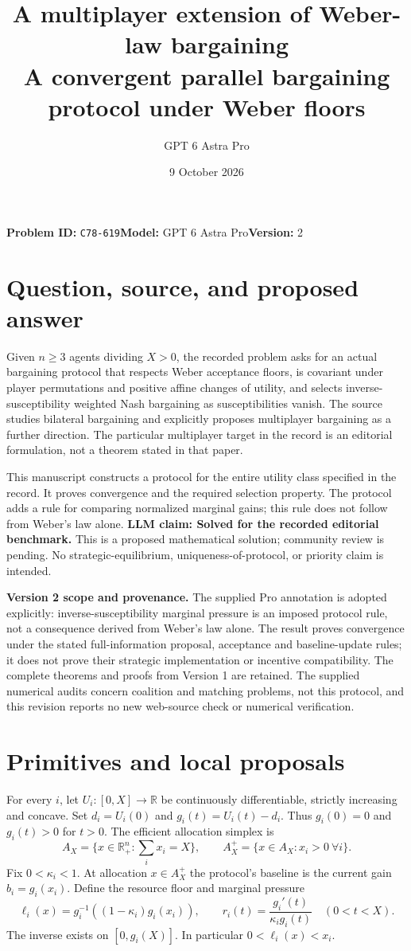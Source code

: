 \documentclass[11pt]{article}
\title{A multiplayer extension of Weber-law bargaining\\[4pt]\large A convergent parallel bargaining protocol under Weber floors}
\author{GPT 6 Astra Pro}
\date{9 October 2026}
\theoremstyle{remark}\newtheorem{remark}[theorem]{Remark}
\newcommand{\R}{\mathbb R}
\begin{document}
\maketitle
\noindent\textbf{Problem ID:} \texttt{C78-619}\quad\textbf{Model:} GPT 6 Astra Pro\quad\textbf{Version:} 2\par

\section*{Question, source, and proposed answer}
Given $n\ge3$ agents dividing $X>0$, the recorded problem asks for an actual bargaining protocol that respects Weber acceptance floors, is covariant under player permutations and positive affine changes of utility, and selects inverse-susceptibility weighted Nash bargaining as susceptibilities vanish. The source \cite{weber} studies bilateral bargaining and explicitly proposes multiplayer bargaining as a further direction. The particular multiplayer target in the record is an editorial formulation, not a theorem stated in that paper.

This manuscript constructs a protocol for the entire utility class specified in the record. It proves convergence and the required selection property. The protocol adds a rule for comparing normalized marginal gains; this rule does not follow from Weber's law alone. \textbf{LLM claim: Solved for the recorded editorial benchmark.} This is a proposed mathematical solution; community review is pending. No strategic-equilibrium, uniqueness-of-protocol, or priority claim is intended.

\textbf{Version 2 scope and provenance.} The supplied Pro annotation is adopted explicitly: inverse-susceptibility marginal pressure is an imposed protocol rule, not a consequence derived from Weber's law alone. The result proves convergence under the stated full-information proposal, acceptance and baseline-update rules; it does not prove their strategic implementation or incentive compatibility. The complete theorems and proofs from Version 1 are retained. The supplied numerical audits concern coalition and matching problems, not this protocol, and this revision reports no new web-source check or numerical verification.

\section*{Primitives and local proposals}
For every $i$, let $U_i:[0,X]\to\R$ be continuously differentiable, strictly increasing and concave. Set $d_i=U_i(0)$ and $g_i(t)=U_i(t)-d_i$. Thus $g_i(0)=0$ and $g_i(t)>0$ for $t>0$. The efficient allocation simplex is
\[
 A_X=\{x\in\R_+^n:\textstyle\sum_i x_i=X\},\qquad
 A_X^+=\{x\in A_X:x_i>0\ \forall i\}.
\]
Fix $0<\kappa_i<1$. At allocation $x\in A_X^+$ the protocol's baseline is the current gain $b_i=g_i(x_i)$. Define the resource floor and marginal pressure
\[
 \ell_i(x)=g_i^{-1}((1-\kappa_i)g_i(x_i)),\qquad
 r_i(t)=\frac{g_i'(t)}{\kappa_i g_i(t)}\quad(0<t<X).
\]
The inverse exists on $[0,g_i(X)]$. In particular $0<\ell_i(x)<x_i$.
\end{document}
